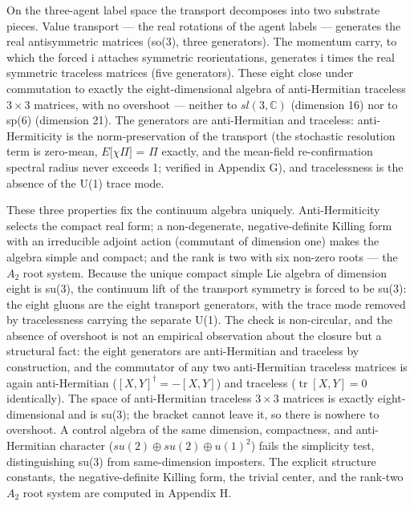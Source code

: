 \documentclass[11pt,oneside]{report}
\theoremstyle{definition}
\theoremstyle{remark}
\begin{document}
On the three-agent label space the transport decomposes into two
substrate pieces. Value transport --- the real rotations of the agent
labels --- generates the real antisymmetric matrices (so(3), three
generators). The momentum carry, to which the forced i attaches
symmetric reorientations, generates i times the real symmetric traceless
matrices (five generators). These eight close under commutation to
exactly the eight-dimensional algebra of anti-Hermitian traceless \ensuremath{3\times 3}
matrices, with no overshoot --- neither to \ensuremath{sl(3,\mathbb{C})} (dimension 16) nor to
sp(6) (dimension 21). The generators are anti-Hermitian and traceless:
anti-Hermiticity is the norm-preservation of the transport (the
stochastic resolution term is zero-mean, \ensuremath{E[\chi}\textbar \ensuremath{\Pi ]} = \ensuremath{\Pi} exactly,
and the mean-field re-confirmation spectral radius never exceeds 1;
verified in Appendix G), and tracelessness is the absence of the U(1)
trace mode.

These three properties fix the continuum algebra uniquely.
Anti-Hermiticity selects the compact real form; a non-degenerate,
negative-definite Killing form with an irreducible adjoint action
(commutant of dimension one) makes the algebra simple and compact; and
the rank is two with six non-zero roots --- the \ensuremath{A_{2}} root system. Because
the unique compact simple Lie algebra of dimension eight is su(3), the
continuum lift of the transport symmetry is forced to be su(3): the
eight gluons are the eight transport generators, with the trace mode
removed by tracelessness carrying the separate U(1). The check is non-circular, and the absence of overshoot is not an
empirical observation about the closure but a structural fact: the eight
generators are anti-Hermitian and traceless by construction, and the
commutator of any two anti-Hermitian traceless matrices is again
anti-Hermitian (\ensuremath{[X,Y]^{\dagger} = -[X,Y]}) and traceless
(\ensuremath{\operatorname{tr}[X,Y] = 0} identically). The space of anti-Hermitian
traceless \ensuremath{3\times 3} matrices is exactly eight-dimensional and is su(3); the
bracket cannot leave it, so there is nowhere to overshoot. A control algebra
of the same dimension, compactness, and anti-Hermitian character
(\ensuremath{su(2) \oplus su(2) \oplus u(1)^{2}}) fails the simplicity test, distinguishing
su(3) from same-dimension imposters. The explicit structure constants,
the negative-definite Killing form, the trivial center, and the rank-two
\ensuremath{A_{2}} root system are computed in Appendix H.
\end{document}
